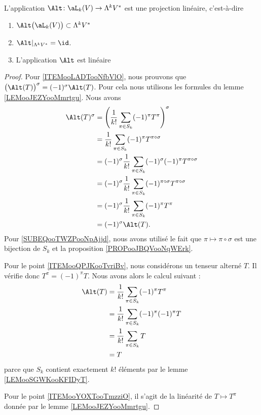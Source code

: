 \begin{lemma}		\label{LEMooWYCAooKoFpRu}
	L'application \(\Alt \colon \aL_k(V)\to \Lambda^kV^*  \) est une projection linéaire, c'est-à-dire
	\begin{enumerate}
		\item\label{ITEMooLADTooNfbVlO} \( \Alt\big( \aL_k(V) \big)\subset \Lambda^kV^*  \)
		\item\label{ITEMooQPJKooTvriBv} \( \Alt|_{\Lambda^kV^*}=\id\).
		\item		\label{ITEMooYOXTooTmzziO}
		      L'application \( \Alt\) est linéaire
	\end{enumerate}
\end{lemma}

\begin{proof}
	Pour \ref{ITEMooLADTooNfbVlO}, nous prouvons que \( \big( \Alt(T) \big)^{\sigma}=(-1)^{\sigma}\Alt(T)\). Pour cela nous utilisons les formules du lemme \ref{LEMooJEZYooMmrtgu}. Nous avons
	\begin{subequations}
		\begin{align}
			\Alt(T)^{\sigma} & = \left( \frac{1}{ k!}\sum_{\pi\in S_k}(-1)^{\pi}T^{\pi} \right)^{\sigma}                   \\
			                 & = \frac{1}{ k!}\sum_{\pi\in S_k}(-1)^{\pi}T^{\pi\circ\sigma}                                \\
			                 & = (-1)^{\sigma}\frac{1}{ k!}\sum_{\pi\in S_k}(-1)^{\sigma}(-1)^{\pi}T^{\pi\circ\sigma}      \\
			                 & = (-1)^{\sigma}\frac{1}{ k!}\sum_{\pi\in S_k}(-1)^{\pi\circ \sigma}T^{\pi\circ\sigma}       \\
			                 & = (-1)^{\sigma}\frac{1}{ k!}\sum_{\pi\in S_k}(-1)^{\pi}T^{\pi}		\label{SUBEQooTWZPooNpAjjd} \\
			                 & =(-1)^{\sigma}\Alt(T).
		\end{align}
	\end{subequations}
	Pour \eqref{SUBEQooTWZPooNpAjjd}, nous avons utilisé le fait que \( \pi\mapsto\pi\circ\sigma\) est une bijection de \( S_k\) et la proposition \ref{PROPooJBQVooNqWErk}.

	Pour le point \ref{ITEMooQPJKooTvriBv}, nous considérons un tenseur alterné \( T\). Il vérifie donc \( T^{\pi}=(-1)^{\pi}T\). Nous avons alors le calcul suivant :
	\begin{subequations}
		\begin{align}
			\Alt(T) & =\frac{1}{ k!}\sum_{\pi\in S_k}(-1)^{\pi}T^{\pi}     \\
			        & =\frac{1}{ k!}\sum_{\pi\in S_k}(-1)^{\pi}(-1)^{\pi}T \\
			        & =\frac{1}{ k!}\sum_{\pi\in S_k}T                     \\
			        & =T
		\end{align}
	\end{subequations}
	parce que \( S_k\) contient exactement \( k!\) éléments par le lemme \ref{LEMooSGWKooKFIDyT}.

	Pour le point \ref{ITEMooYOXTooTmzziO}, il s'agit de la linéarité de \( T\mapsto T^{\pi}\) donnée par le lemme \ref{LEMooJEZYooMmrtgu}.
\end{proof}

